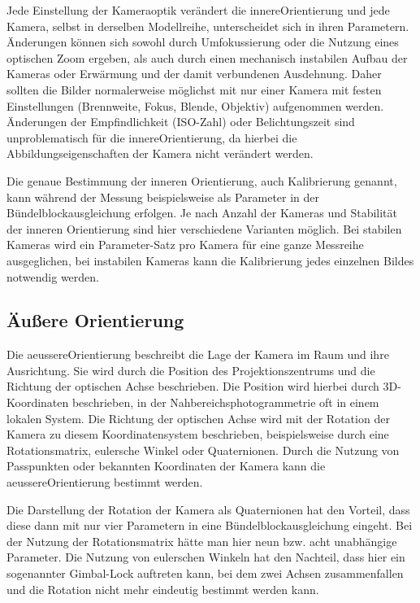 \documentclass[./00PhotoBox.tex]{subfiles}
\begin{document}
Jede Einstellung der Kameraoptik verändert die \gls{innereOrientierung} und jede Kamera, selbst in derselben Modellreihe, unterscheidet sich in ihren Parametern. Änderungen können sich sowohl durch Umfokussierung oder die Nutzung eines optischen Zoom ergeben, als auch durch einen mechanisch instabilen Aufbau der Kameras oder Erwärmung und der damit verbundenen Ausdehnung. Daher sollten die Bilder normalerweise möglichst mit nur einer Kamera mit festen Einstellungen (Brennweite, Fokus, Blende, Objektiv) aufgenommen werden. Änderungen der Empfindlichkeit (ISO-Zahl) oder Belichtungszeit sind unproblematisch für die \gls{innereOrientierung}, da hierbei die Abbildungseigenschaften der Kamera nicht verändert werden. \citep[vgl.][S. 176]{luhmann}

Die genaue Bestimmung der inneren Orientierung, auch Kalibrierung genannt, kann wäh\-rend der Messung beispielsweise als Parameter in der Bündel\-block\-ausgleichung erfolgen. Je nach Anzahl der Kameras und Stabilität der inneren Orientierung sind hier verschiedene Varianten möglich. Bei stabilen Kameras wird ein Parameter-Satz pro Kamera für eine ganze Messreihe ausgeglichen, bei instabilen Kameras kann die Kalibrierung jedes einzelnen Bildes notwendig werden. \citep[vgl.][S. 181f]{luhmann}

\subsection{Äußere Orientierung}
\label{s:aeussereorientierung}
Die \gls{aeussereOrientierung} beschreibt die Lage der Kamera im Raum und ihre Ausrichtung. Sie wird durch die Position des Projektionszentrums und die Richtung der optischen Achse beschrieben. Die Position wird hierbei durch 3D-Koordinaten beschrieben, in der Nahbereichsphotogrammetrie oft in einem lokalen System. Die Richtung der optischen Achse wird mit der Rotation der Kamera zu diesem Koordinatensystem beschrieben, beispielsweise durch eine Rotationsmatrix, eulersche Winkel oder Quaternionen. Durch die Nutzung von Passpunkten oder bekannten Koordinaten der Kamera kann die \gls{aeussereOrientierung} bestimmt werden. \citep[vgl.][S. 273ff]{luhmann}

Die Darstellung der Rotation der Kamera als Quaternionen hat den Vorteil, dass diese dann mit nur vier Parametern in eine Bündelblockausgleichung eingeht. Bei der Nutzung der Rotationsmatrix hätte man hier neun bzw. acht unabhängige Parameter. Die Nutzung von eulerschen Winkeln hat den Nachteil, dass hier ein sogenannter Gimbal-Lock auftreten kann, bei dem zwei Achsen zusammenfallen und die Rotation nicht mehr eindeutig bestimmt werden kann. \citep[vgl.][S. 63]{luhmann}
\end{document}
